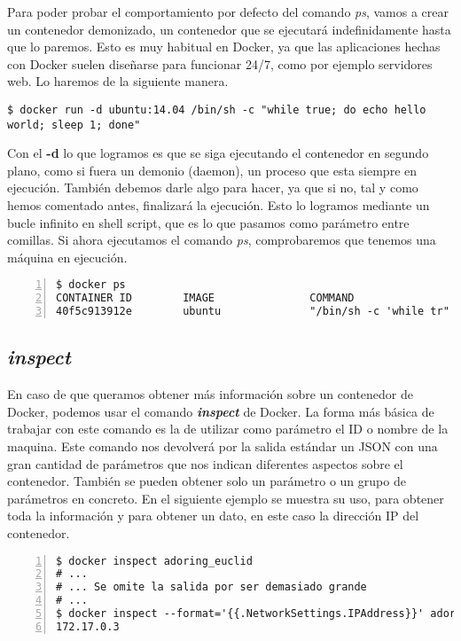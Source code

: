 	Para poder probar el comportamiento por defecto del comando \emph{ps}, vamos a crear un contenedor demonizado, un contenedor que se ejecutará indefinidamente hasta que lo paremos. Esto es muy habitual en Docker, ya que las aplicaciones hechas con Docker suelen diseñarse para funcionar 24/7, como por ejemplo servidores web. Lo haremos de la siguiente manera.
	
	\begin{lstlisting}[style=consola]
$ docker run -d ubuntu:14.04 /bin/sh -c "while true; do echo hello world; sleep 1; done"
	\end{lstlisting}
	
	Con el \textbf{-d} lo que logramos es que se siga ejecutando el contenedor en segundo plano, como si fuera un demonio (daemon), un proceso que esta siempre en ejecución. También debemos darle algo para hacer, ya que si no, tal y como hemos comentado antes, finalizará la ejecución. Esto lo logramos mediante un bucle infinito en shell script, que es lo que pasamos como parámetro entre comillas. Si ahora ejecutamos el comando \emph{ps}, comprobaremos que tenemos una máquina en ejecución.
	
	\begin{lstlisting}[style=consola,numbers=left]
$ docker ps
CONTAINER ID        IMAGE               COMMAND                  CREATED             STATUS              PORTS               NAMES
40f5c913912e        ubuntu              "/bin/sh -c 'while tr"   2 seconds ago       Up 2 seconds                            adoring_euclid
	\end{lstlisting}
	
	\subsection{\textit{inspect}}
	En caso de que queramos obtener más información sobre un contenedor de Docker, podemos usar el comando \textbf{\emph{inspect}} de Docker. La forma más básica de trabajar con este comando es la de utilizar como parámetro el ID o nombre de la maquina. Este comando nos devolverá por la salida estándar un JSON con una gran cantidad de parámetros que nos indican diferentes aspectos sobre el contenedor. También se pueden obtener solo un parámetro o un grupo de parámetros en concreto. En el siguiente ejemplo se muestra su uso, para obtener toda la información y para obtener un dato, en este caso la dirección IP del contenedor.
	
	\begin{lstlisting}[style=consola,numbers=left]
$ docker inspect adoring_euclid
# ...
# ... Se omite la salida por ser demasiado grande
# ...
$ docker inspect --format='{{.NetworkSettings.IPAddress}}' adoring_euclid
172.17.0.3
	\end{lstlisting}

